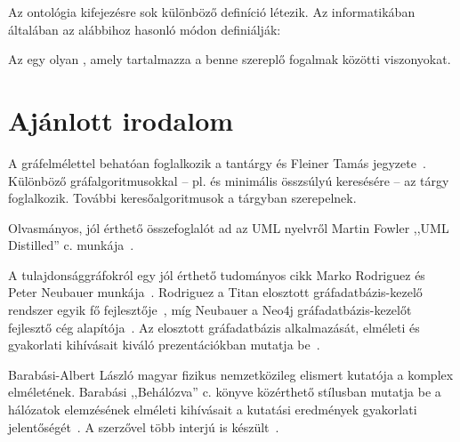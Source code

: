 Az ontológia kifejezésre sok különböző definíció létezik. Az informatikában általában az alábbihoz hasonló módon definiálják:

\begin{definicio}
Az  egy olyan , amely tartalmazza a benne szereplő fogalmak közötti viszonyokat. 
\end{definicio}


\section{Ajánlott irodalom}

A gráfelmélettel behatóan foglalkozik a \bszketto tantárgy és Fleiner Tamás jegyzete~\cite{FleinerJegyzet}. Különböző gráfalgoritmusokkal -- pl.  és minimális összsúlyú  keresésére -- az \algel tárgy foglalkozik. További keresőalgoritmusok a \mestersegesintelligencia tárgyban szerepelnek.

Olvasmányos, jól érthető összefoglalót ad az UML nyelvről Martin Fowler ,,UML Distilled'' c. munkája~\cite{fowler1997uml}.

A tulajdonsággráfokról egy jól érthető tudományos cikk Marko Rodriguez és Peter Neubauer munkája~\cite{Rodriguez2010}. Rodriguez a Titan elosztott gráfadatbázis-kezelő rendszer egyik fő fejlesztője~\cite{Titan}, míg Neubauer a Neo4j gráfadatbázis-kezelőt fejlesztő cég alapítója~\cite{Neo4j}. Az elosztott gráfadatbázis alkalmazását, elméleti és gyakorlati kihívásait kiváló prezentációkban mutatja be~\cite{RodriguezSlides2012,RodriguezSlides2013}.

Barabási-Albert László magyar fizikus nemzetközileg elismert kutatója a komplex  elméletének. Barabási ,,Behálózva'' c. könyve közérthető stílusban mutatja be a hálózatok elemzésének elméleti kihívásait a kutatási eredmények gyakorlati jelentőségét~\cite{behalozva}. A szerzővel több interjú is készült~\cite{barabasi1,barabasi2,barabasi3}.

